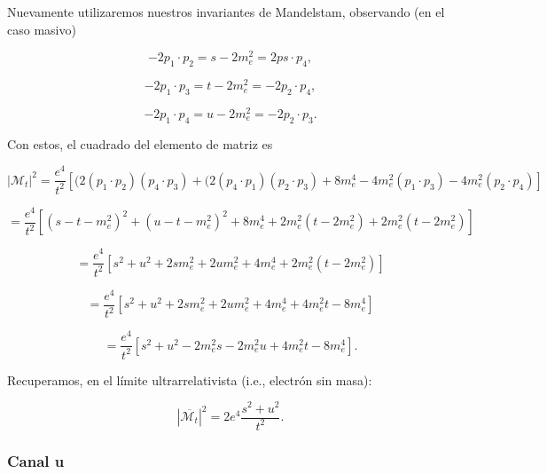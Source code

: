 Nuevamente utilizaremos nuestros invariantes de Mandelstam, observando (en el caso masivo)

\begin{equation}
-2p_1 \cdot p_2 = s - 2m_e^2 = 2ps \cdot p_4,
\end{equation}

\begin{equation}
-2p_1 \cdot p_3 = t - 2m_e^2 = -2p_2 \cdot p_4,
\end{equation}

\begin{equation}
-2p_1 \cdot p_4 = u - 2m_e^2 = -2p_2 \cdot p_3.
\end{equation}

Con estos, el cuadrado del elemento de matriz es

\begin{equation}
|\mathcal{M}_t|^2 = \frac{e^4}{t^2} \left[ (2(p_1 \cdot p_2)(p_4 \cdot p_3) + (2(p_4 \cdot p_1)(p_2 \cdot p_3) + 8m_e^4 - 4m_e^2(p_1 \cdot p_3) - 4m_e^2(p_2 \cdot p_4) \right]
\end{equation}

\begin{equation}
= \frac{e^4}{t^2} \left[ (s - t - m_e^2)^2 + (u - t - m_e^2)^2 + 8m_e^4 + 2m_e^2(t - 2m_e^2) + 2m_e^2(t - 2m_e^2) \right]
\end{equation}

\begin{equation}
= \frac{e^4}{t^2} \left[ s^2 + u^2 + 2sm_e^2 + 2um_e^2 + 4m_e^4 + 2m_e^2(t - 2m_e^2) \right]
\end{equation}

\begin{equation}
= \frac{e^4}{t^2} \left[ s^2 + u^2 + 2sm_e^2 + 2um_e^2 + 4m_e^4 + 4m_e^2t - 8m_e^4 \right]
\end{equation}

\begin{equation}
= \frac{e^4}{t^2} \left[ s^2 + u^2 - 2m_e^2s - 2m_e^2u + 4m_e^2t - 8m_e^4 \right].
\end{equation}

Recuperamos, en el límite ultrarrelativista (i.e., electrón sin masa):

\begin{equation}
|\overline{\mathcal{M}_t}|^2 = 2e^4 \frac{s^2 + u^2}{t^2}.
\end{equation}

\subsubsection{Canal u}

